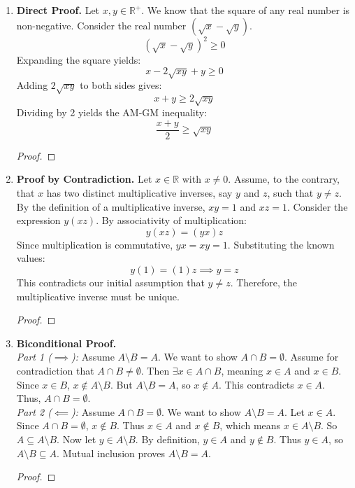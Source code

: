 \documentclass[11pt]{article}
\renewcommand{\qedsymbol}{$\blacksquare$}
\begin{document}
\begin{enumerate}
    \item \textbf{Direct Proof.} Let $x, y \in \mathbb{R}^+$. We know that the square of any real number is non-negative. Consider the real number $(\sqrt{x} - \sqrt{y})$.
    \[ (\sqrt{x} - \sqrt{y})^2 \ge 0 \]
    Expanding the square yields:
    \[ x - 2\sqrt{xy} + y \ge 0 \]
    Adding $2\sqrt{xy}$ to both sides gives:
    \[ x + y \ge 2\sqrt{xy} \]
    Dividing by 2 yields the AM-GM inequality:
    \[ \frac{x+y}{2} \ge \sqrt{xy} \]
    \begin{proof}\renewcommand{\qedsymbol}{$\blacksquare$}\end{proof}

    \item \textbf{Proof by Contradiction.} Let $x \in \mathbb{R}$ with $x \neq 0$. Assume, to the contrary, that $x$ has two distinct multiplicative inverses, say $y$ and $z$, such that $y \neq z$. By the definition of a multiplicative inverse, $xy = 1$ and $xz = 1$. Consider the expression $y(xz)$. By associativity of multiplication:
    \[ y(xz) = (yx)z \]
    Since multiplication is commutative, $yx = xy = 1$. Substituting the known values:
    \[ y(1) = (1)z \implies y = z \]
    This contradicts our initial assumption that $y \neq z$. Therefore, the multiplicative inverse must be unique.
    \begin{proof}\renewcommand{\qedsymbol}{$\blacksquare$}\end{proof}

    \item \textbf{Biconditional Proof.} \\
    \textit{Part 1 ($\implies$):} Assume $A \setminus B = A$. We want to show $A \cap B = \emptyset$. Assume for contradiction that $A \cap B \neq \emptyset$. Then $\exists x \in A \cap B$, meaning $x \in A$ and $x \in B$. Since $x \in B$, $x \notin A \setminus B$. But $A \setminus B = A$, so $x \notin A$. This contradicts $x \in A$. Thus, $A \cap B = \emptyset$. \\
    \textit{Part 2 ($\impliedby$):} Assume $A \cap B = \emptyset$. We want to show $A \setminus B = A$. Let $x \in A$. Since $A \cap B = \emptyset$, $x \notin B$. Thus $x \in A$ and $x \notin B$, which means $x \in A \setminus B$. So $A \subseteq A \setminus B$. Now let $y \in A \setminus B$. By definition, $y \in A$ and $y \notin B$. Thus $y \in A$, so $A \setminus B \subseteq A$. Mutual inclusion proves $A \setminus B = A$.
    \begin{proof}\renewcommand{\qedsymbol}{$\blacksquare$}\end{proof}


\end{enumerate}
\end{document}
